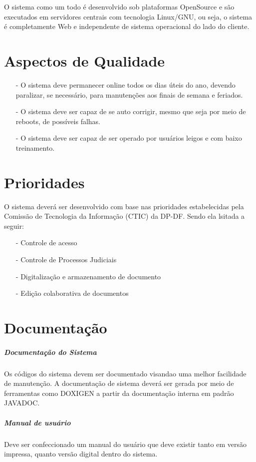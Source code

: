 \documentclass[12pt,a4paper]{report}
\begin{document}
O sistema como um todo é desenvolvido sob plataformas OpenSource e são executados em servidores centrais com tecnologia Linux/GNU, ou seja, o sistema é completamente Web e independente de sistema operacional do lado do cliente.

\chapter{Aspectos de Qualidade}

\begin{itemize}
\item [-] O sistema deve permanecer online todos os dias úteis do ano, devendo paralizar, se necessário, para manutenções aos finais de semana e feriados.
\item [-] O sistema deve ser capaz de se auto corrigir, mesmo que seja por meio de reboots, de possíveis falhas.
\item [-] O sistema deve ser capaz de ser operado por usuários leigos e com baixo treinamento.
\end{itemize}

\chapter{Prioridades}

O sistema deverá ser desenvolvido com base nas prioridades estabelecidas pela Comissão de Tecnologia da Informação (CTIC) da DP-DF. Sendo ela lsitada a seguir:
\begin{itemize}
\item [-] Controle de acesso
\item [-] Controle de Processos Judiciais
\item [-] Digitalização e armazenamento de documento
\item [-] Edição colaborativa de documentos
\end{itemize}

\chapter{Documentação}

\paragraph{Documentação do Sistema} Os códigos do sistema devem ser documentado visandao uma melhor facilidade de manutenção. A documentação de sistema deverá ser gerada por meio de ferramentas como DOXIGEN a partir da documentação interna em padrão JAVADOC.

\paragraph{Manual de usuário} Deve ser confeccionado um manual do usuário que deve existir tanto em versão impressa, quanto versão digital dentro do sistema.
\end{document}
